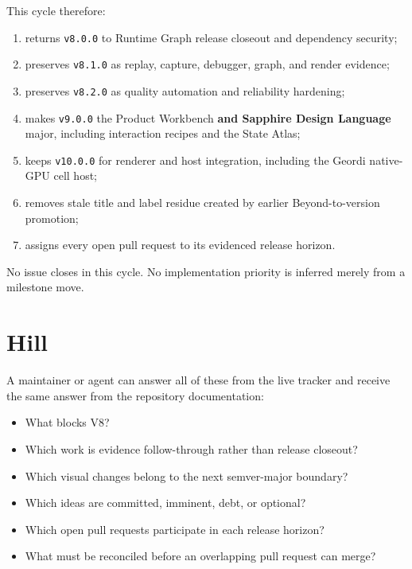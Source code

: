 This cycle therefore:

\begin{enumerate}
\def\labelenumi{\arabic{enumi}.}
\tightlist
\item
  returns \texttt{v\allowbreak{}8\allowbreak{}.\allowbreak{}0\allowbreak{}.\allowbreak{}0} to Runtime Graph release closeout and dependency security;
\item
  preserves \texttt{v\allowbreak{}8\allowbreak{}.\allowbreak{}1\allowbreak{}.\allowbreak{}0} as replay, capture, debugger, graph, and render evidence;
\item
  preserves \texttt{v\allowbreak{}8\allowbreak{}.\allowbreak{}2\allowbreak{}.\allowbreak{}0} as quality automation and reliability hardening;
\item
  makes \texttt{v\allowbreak{}9\allowbreak{}.\allowbreak{}0\allowbreak{}.\allowbreak{}0} the Product Workbench \textbf{and Sapphire Design Language} major, including interaction recipes and the State Atlas;
\item
  keeps \texttt{v\allowbreak{}1\allowbreak{}0\allowbreak{}.\allowbreak{}0\allowbreak{}.\allowbreak{}0} for renderer and host integration, including the Geordi native-GPU cell host;
\item
  removes stale title and label residue created by earlier Beyond-to-version promotion;
\item
  assigns every open pull request to its evidenced release horizon.
\end{enumerate}

No issue closes in this cycle. No implementation priority is inferred merely from a milestone move.

\section{Hill}\label{record-249-hill}

A maintainer or agent can answer all of these from the live tracker and receive the same answer from the repository documentation:

\begin{itemize}
\tightlist
\item
  What blocks V8?
\item
  Which work is evidence follow-through rather than release closeout?
\item
  Which visual changes belong to the next semver-major boundary?
\item
  Which ideas are committed, imminent, debt, or optional?
\item
  Which open pull requests participate in each release horizon?
\item
  What must be reconciled before an overlapping pull request can merge?
\end{itemize}

